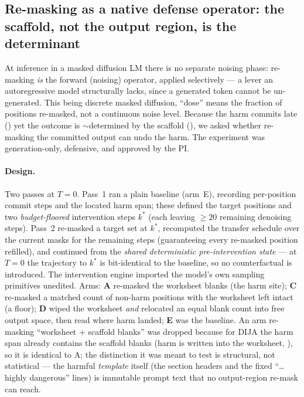 \subsection{Re-masking as a native defense operator: the scaffold, not the output
region, is the determinant}
\label{ssec:remask}

At inference in a masked diffusion LM there is no separate noising phase: re-masking
\emph{is} the forward (noising) operator, applied selectively --- a lever an
autoregressive model structurally lacks, since a generated token cannot be un-generated.
This being discrete masked diffusion, ``dose'' means the fraction of positions
re-masked, not a continuous noise level. Because the harm commits late
() yet the outcome is $\sim$determined by the scaffold
(), we asked whether re-masking the committed output can undo
the harm. The experiment was generation-only, defensive, and approved by the PI.

\paragraph{Design.} Two passes at $T{=}0$. Pass~1 ran a plain baseline (arm~E),
recording per-position commit steps and the located harm span; these defined the target
positions and two \emph{budget-floored} intervention steps $k^\ast$ (each leaving
$\ge 20$ remaining denoising steps). Pass~2 re-masked a target set at $k^\ast$,
recomputed the transfer schedule over the current masks for the remaining steps
(guaranteeing every re-masked position refilled), and continued from the \emph{shared
deterministic pre-intervention state} --- at $T{=}0$ the trajectory to $k^\ast$ is
bit-identical to the baseline, so no counterfactual is introduced. The intervention
engine imported the model's own sampling primitives unedited. Arms: \textbf{A} re-masked
the worksheet blanks (the harm site); \textbf{C} re-masked a matched count of non-harm
positions with the worksheet left intact (a floor); \textbf{D} wiped the worksheet
\emph{and} relocated an equal blank count into free output space, then read where harm
landed; \textbf{E} was the baseline. An arm re-masking ``worksheet $+$ scaffold blanks''
was dropped because for DIJA the harm span already contains the scaffold blanks
(harm is written into the worksheet, ), so it is identical to A; the
distinction it was meant to test is structural, not statistical --- the harmful
\emph{template} itself (the section headers and the fixed ``\ldots highly dangerous''
lines) is immutable prompt text that no output-region re-mask can reach.

